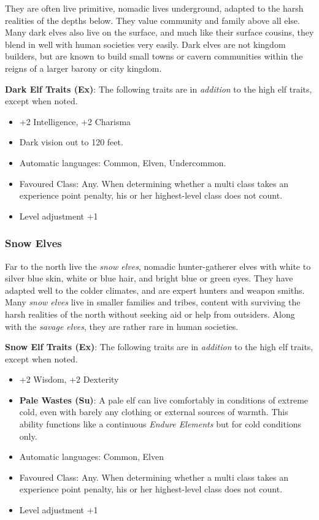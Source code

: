 They are often live primitive, nomadic lives underground, adapted to the harsh
realities of the depths below. They value community and family above all
else. Many dark elves also live on the surface, and much like their surface
cousins, they blend in well with human societies very easily. Dark elves are
not kingdom builders, but are known to build small towns or cavern communities
within the reigns of a larger barony or city kingdom.

\begin{35e}
  \textbf{Dark Elf Traits (Ex)}: The following traits are in \emph{addition}
  to the high elf traits, except when noted.
  \begin{itemize}[noitemsep]
    \item +2 Intelligence, +2 Charisma
    \item Dark vision out to 120 feet.
    \item Automatic languages: Common, Elven, Undercommon.
    \item Favoured Class: Any. When determining whether a multi class takes an
    experience point penalty, his or her highest-level class does not count.
    \item Level adjustment +1
  \end{itemize}
\end{35e}

\subsubsection*{Snow Elves}


Far to the north live the \emph{snow elves}, nomadic hunter-gatherer elves
with white to silver blue skin, white or blue hair, and bright blue or green
eyes. They have adapted well to the colder climates, and are expert hunters
and weapon smiths. Many \emph{snow elves} live in smaller families and tribes,
content with surviving the harsh realities of the north without seeking aid
or help from outsiders. Along with the \emph{savage elves}, they are rather
rare in human societies.

\begin{35e}
  \textbf{Snow Elf Traits (Ex)}: The following traits are in \emph{addition}
  to the high elf traits, except when noted.
  \begin{itemize}[noitemsep]
    \item +2 Wisdom, +2 Dexterity
    \item \textbf{Pale Wastes (Su)}: A pale elf can live comfortably in
    conditions of extreme cold, even with barely any clothing or external
    sources of warmth. This ability functions like a continuous \emph{Endure
    Elements} but for cold conditions only.
    \item Automatic languages: Common, Elven
    \item Favoured Class: Any. When determining whether a multi class takes an
    experience point penalty, his or her highest-level class does not count.
    \item Level adjustment +1
  \end{itemize}
\end{35e}

